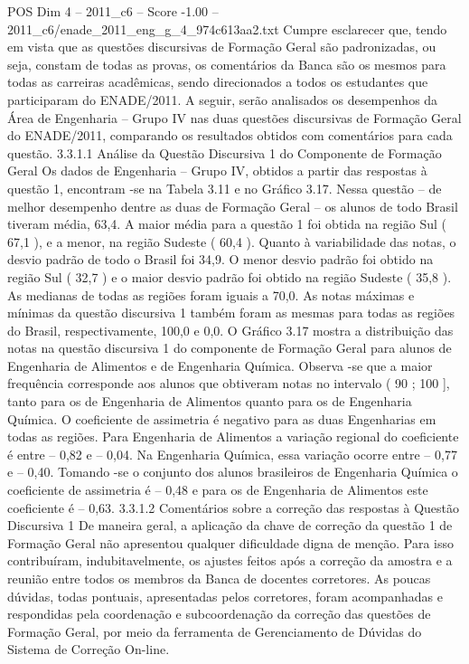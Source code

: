 \begin{textsample}{POS Dim 4 – 2011\_c6 – Score -1.00 – 2011\_c6/enade\_2011\_eng\_g\_4\_974c613aa2.txt}
Cumpre esclarecer que, tendo em vista que as questões discursivas de Formação Geral são padronizadas, ou seja, constam de todas as provas, os comentários da Banca são os mesmos para todas as carreiras acadêmicas, sendo direcionados a todos os estudantes que participaram do ENADE/2011.
A seguir, serão analisados os desempenhos da Área de Engenharia – Grupo IV nas duas questões discursivas de Formação Geral do ENADE/2011, comparando os resultados obtidos com comentários para cada questão. 3.3.1.1 Análise da Questão Discursiva 1 do Componente de Formação Geral Os dados de Engenharia – Grupo IV, obtidos a partir das respostas à questão 1, encontram -se na Tabela 3.11 e no Gráfico 3.17.
Nessa questão – de melhor desempenho dentre as duas de Formação Geral – os alunos de todo Brasil tiveram média, 63,4.
A maior média para a questão 1 foi obtida na região Sul ( 67,1 ), e a menor, na região Sudeste ( 60,4 ).
Quanto à variabilidade das notas, o desvio padrão de todo o Brasil foi 34,9.
O menor desvio padrão foi obtido na região Sul ( 32,7 ) e o maior desvio padrão foi obtido na região Sudeste ( 35,8 ).
As medianas de todas as regiões foram iguais a 70,0.
As notas máximas e mínimas da questão discursiva 1 também foram as mesmas para todas as regiões do Brasil, respectivamente, 100,0 e 0,0.
O Gráfico 3.17 mostra a distribuição das notas na questão discursiva 1 do componente de Formação Geral para alunos de Engenharia de Alimentos e de Engenharia Química.
Observa -se que a maior frequência corresponde aos alunos que obtiveram notas no intervalo ( 90 ; 100 ], tanto para os de Engenharia de Alimentos quanto para os de Engenharia Química.
O coeficiente de assimetria é negativo para as duas Engenharias em todas as regiões.
Para Engenharia de Alimentos a variação regional do coeficiente é entre – 0,82 e – 0,04.
Na Engenharia Química, essa variação ocorre entre – 0,77 e – 0,40.
Tomando -se o conjunto dos alunos brasileiros de Engenharia Química o coeficiente de assimetria é – 0,48 e para os de Engenharia de Alimentos este coeficiente é – 0,63. 3.3.1.2 Comentários sobre a correção das respostas à Questão Discursiva 1 De maneira geral, a aplicação da chave de correção da questão 1 de Formação Geral não apresentou qualquer dificuldade digna de menção.
Para isso contribuíram, indubitavelmente, os ajustes feitos após a correção da amostra e a reunião entre todos os membros da Banca de docentes corretores.
As poucas dúvidas, todas pontuais, apresentadas pelos corretores, foram acompanhadas e respondidas pela coordenação e subcoordenação da correção das questões de Formação Geral, por meio da ferramenta de Gerenciamento de Dúvidas do Sistema de Correção On-line.

\end{textsample}
